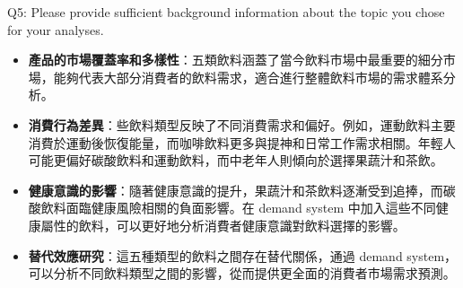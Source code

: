 \documentclass[12pt]{beamer}
\begin{document}
\begin{frame}{Q5: Please provide sufficient background information about the topic you chose for your analyses.}
	\begin{itemize}
		\item \textbf{產品的市場覆蓋率和多樣性}：五類飲料涵蓋了當今飲料市場中最重要的細分市場，能夠代表大部分消費者的飲料需求，適合進行整體飲料市場的需求體系分析。
		\vspace{0.3cm}
		\item \textbf{消費行為差異}：些飲料類型反映了不同消費需求和偏好。例如，運動飲料主要消費於運動後恢復能量，而咖啡飲料更多與提神和日常工作需求相關。年輕人可能更偏好碳酸飲料和運動飲料，而中老年人則傾向於選擇果蔬汁和茶飲。
		\vspace{0.3cm}
		\item \textbf{健康意識的影響}：隨著健康意識的提升，果蔬汁和茶飲料逐漸受到追捧，而碳酸飲料面臨健康風險相關的負面影響。在 demand system 中加入這些不同健康屬性的飲料，可以更好地分析消費者健康意識對飲料選擇的影響。
		\vspace{0.3cm}
		\item \textbf{替代效應研究}：這五種類型的飲料之間存在替代關係，通過 demand system，可以分析不同飲料類型之間的影響，從而提供更全面的消費者市場需求預測。
	\end{itemize}
\end{frame}

		
		
		
	
\end{document}
